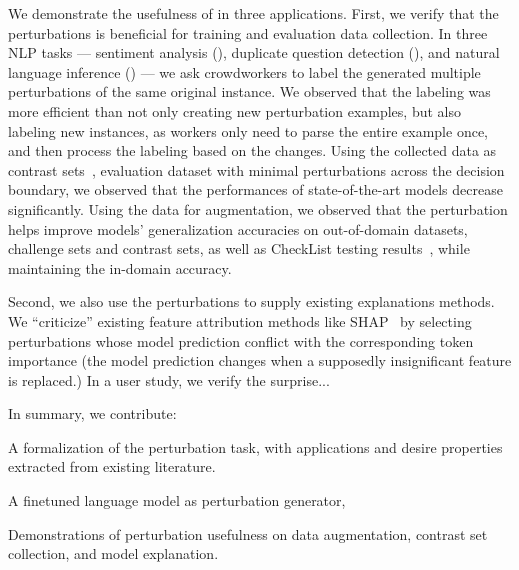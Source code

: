 We demonstrate the usefulness of \sysname in three applications. 
First, we verify that the perturbations is beneficial for training and evaluation data collection. 
In three NLP tasks --- sentiment analysis (\sst), duplicate question detection (\qqp), and natural language inference (\nli) --- we ask crowdworkers to label the generated multiple perturbations of the same original instance.
We observed that the labeling was more efficient than not only creating new perturbation examples, but also labeling new instances, as workers only need to parse the entire example once, and then process the labeling based on the changes.
Using the collected data as contrast sets~\cite{gardner2020contrast}, \ie evaluation dataset with minimal perturbations across the decision boundary, we observed that the performances of state-of-the-art models decrease significantly. 
Using the data for augmentation, we observed that the perturbation helps improve models' generalization accuracies on out-of-domain datasets, challenge sets and contrast sets, as well as CheckList testing results~\cite{checklist:acl20}, while maintaining the in-domain accuracy.

Second, we also use the perturbations to supply existing explanations methods.
We ``criticize'' existing feature attribution methods like SHAP~\cite{NIPS2017_7062} by selecting perturbations whose model prediction conflict with the corresponding token importance (\eg the model prediction changes when a supposedly insignificant feature is replaced.)
In a user study, we verify the surprise...

In summary, we contribute: 
\begin{compactenum}
\item A formalization of the perturbation task, with applications and desire properties extracted from existing literature.
\item A finetuned language model as perturbation generator, 
\item Demonstrations of perturbation usefulness on data augmentation, contrast set collection, and model explanation. 
\end{compactenum}







